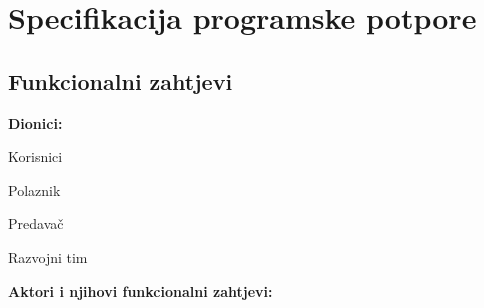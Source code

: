 \chapter{Specifikacija programske potpore}
		
	\section{Funkcionalni zahtjevi}
			
			\noindent \textbf{Dionici:}
			
			\begin{packed_enum}
				
				\item Korisnici			
				\begin{packed_enum}
					
					\item Polaznik
					\item Predavač	
				\end{packed_enum}		
				\item Razvojni tim
				
			\end{packed_enum}
			
			\noindent \textbf{Aktori i njihovi funkcionalni zahtjevi:}
			
